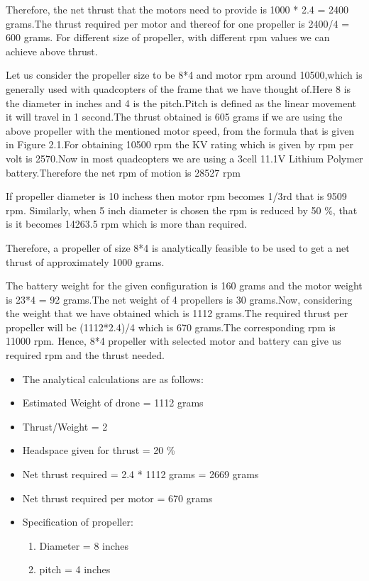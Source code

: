 Therefore, the net thrust that the motors need to provide is 1000 * 2.4 = 2400 grams.The thrust required per motor and thereof for one propeller is 2400/4 = 600 grams.
For different size of propeller, with different rpm values we can achieve above thrust.

Let us consider the propeller size to be 8*4 and motor rpm around 10500,which is generally used with quadcopters of the frame that we have thought of.Here 8 is the diameter in inches and 4 is the pitch.Pitch is defined as the linear movement it will travel in 1 second.The thrust obtained is 605 grams if we are using the above propeller with the mentioned motor speed, from the formula that is given in Figure 2.1.For obtaining 10500 rpm the KV rating which is given by rpm per volt is 2570.Now in most quadcopters we are using a 3cell 11.1V Lithium Polymer battery.Therefore the net rpm of motion is 28527 rpm

If propeller diameter is 10 inchess then motor rpm becomes 1/3rd that is 9509 rpm.
Similarly, when 5 inch diameter is chosen the rpm is reduced by 50 \%, that is it becomes 14263.5 rpm which is more than required.

Therefore, a propeller of size 8*4 is analytically feasible to be used to get a net thrust of approximately 1000 grams.

The battery weight for the given configuration is 160 grams and the motor weight is 23*4 = 92 grams.The net weight of 4 propellers is 30 grams.Now, considering the weight that we have obtained which is 1112 grams.The required thrust per propeller will be (1112*2.4)/4 which is 670 grams.The corresponding rpm is 11000 rpm.
Hence, 8*4 propeller with selected motor and battery can give us required rpm and the thrust needed.



\begin{itemize}

\item The analytical calculations are as follows:

\item Estimated Weight of drone = 1112 grams

\item Thrust/Weight = 2

\item Headspace given for thrust = 20 \%

\item Net thrust required = 2.4 * 1112 grams = 2669 grams

\item Net thrust required per motor = 670 grams

\item Specification of propeller:
\begin{enumerate}
\item Diameter = 8 inches
\item pitch = 4 inches
\end{enumerate}
\end{itemize}


